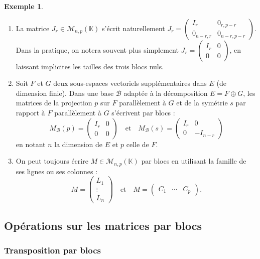 \documentclass[french]{article}
\newcommand{\K}{\mathbb{K}}
\theoremstyle{plain}
\theoremstyle{definition}
\newtheorem*{ex}{Exemple}
\theoremstyle{remark}
\begin{document}
\begin{ex}
	\begin{enumerate}
		\item La matrice $J_r\in\mathcal{M}_{n,p}(\K)$ s'écrit naturellement $J_r=\begin{pmatrix}
			I_r&0_{r,p-r}\\
			0_{n-r,r}&0_{n-r,p-r}
		\end{pmatrix}$. \\
		Dans la pratique, on notera souvent plus simplement $J_r=\begin{pmatrix}
			I_r&0\\
			0&0
		\end{pmatrix}$, en laissant implicites les tailles des trois blocs nuls.
		\item Soit $F$ et $G$ deux sous-espaces vectoriels supplémentaires dans $E$ (de dimension finie). Dans une base $\mathcal{B}$ adaptée à la décomposition $E=F\oplus G$, les matrices de la projection $p$ sur $F$ parallèlement à $G$ et de la symétrie $s$ par rapport à $F$ parallèlement à $G$ s'écrivent par blocs :
		$$M_\mathcal{B}(p)=\begin{pmatrix}
			I_r&0\\
			0&0
		\end{pmatrix}\quad\text{et}\quad M_\mathcal{B}(s)=\begin{pmatrix}
		I_r&0\\
		0&-I_{n-r}
		\end{pmatrix}$$ en notant $n$ la dimension de $E$ et $p$ celle de $F$.
		\item On peut toujours écrire $M\in\mathcal{M}_{n,p}(\K)$ par blocs en utilisant la famille de ses lignes ou ses colonnes :
		$$M=\begin{pmatrix}
			L_1\\
			\vdots\\
			L_n
		\end{pmatrix}\quad\text{et}\quad M=\begin{pmatrix}
		C_1&\cdots&C_p
		\end{pmatrix}.$$
	\end{enumerate}
\end{ex}

\subsection{Opérations sur les matrices par blocs}

\subsubsection*{Transposition par blocs}
\end{document}
